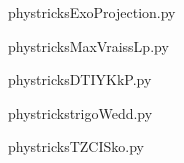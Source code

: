     

    \clearpage
    


    \newcommand{\CaptionFigExoProjection}{<+Type your caption here+>}
    \begin{center}
        
    \end{center}
    phystricksExoProjection.py

    

    \clearpage
    


    \newcommand{\CaptionFigMaxVraissLp}{<+Type your caption here+>}
    \begin{center}
        
    \end{center}
    phystricksMaxVraissLp.py

    

    \clearpage
    


    \newcommand{\CaptionFigDTIYKkP}{<+Type your caption here+>}
    \begin{center}
        
    \end{center}
    phystricksDTIYKkP.py

    

    \clearpage
    


    \newcommand{\CaptionFigtrigoWedd}{<+Type your caption here+>}
    \begin{center}
        
    \end{center}
    phystrickstrigoWedd.py

    

    \clearpage
    


    \newcommand{\CaptionFigTZCISko}{<+Type your caption here+>}
    \begin{center}
        
    \end{center}
    phystricksTZCISko.py

    

    \clearpage
    


